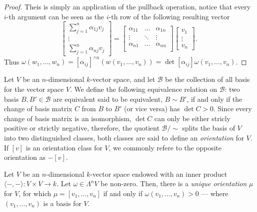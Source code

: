 \begin{proof}
Theis is simply an application of the pullback operation, notice that every
\(i\)-th argument can be seen as the \(i\)-th row of the following resulting
vector
\[
  \begin{bmatrix}
    \sum_{j=1}^n \alpha_{1 j} v_j \\ \vdots \\ \sum_{j=1}^n \alpha_{n j} v_j
  \end{bmatrix}
  =
  \begin{bmatrix}
    \alpha_{11} &\dots &\alpha_{1n} \\
    \vdots &\ddots &\vdots \\
    \alpha_{n1} &\dots &\alpha_{nn} \\
  \end{bmatrix}
  \begin{bmatrix}
    v_1 \\ \vdots \\ v_n
  \end{bmatrix}.
\]
Thus \(\omega(w_1, \dots, w_n) = [\alpha_{ij}]^{\wedge n}(w(v_{1}, \dots, v_n))
= \det [\alpha_{ij}] \omega(v_1, \dots, v_n)\).
\end{proof}

\begin{definition}[Orientation]
\label{def:orientation}
Let \(V\) be an \(n\)-dimensional \(k\)-vector space, and let \(\mathcal B\) be
the collection of all basis for the vector space \(V\). We define the following
equivalence relation on \(\mathcal B\): two basis \(B, B' \in \mathcal B\) are
equivalent said to be equivalent, \(B \sim B'\), if and only if the change of
basis matrix \(C\) from \(B\) to \(B'\) (or vice versa) has \(\det C >
0\). Since every change of basis matrix is an isomorphism, \(\det C\) can only
be either stricly positive or strictly negative, therefore, the quotient
\(\mathcal B/{\sim}\) splits the basis of \(V\) into two distinguished classes,
both classes are said to define an \emph{orientation} for \(V\). If \([v]\) is
an orientation class for \(V\), we commonly refere to the opposite orientation
as \(-[v]\).
\end{definition}

\begin{corollary}\label{cor:unique-orientation}
Let \(V\) be an \(n\)-dimensional \(k\)-vector space endowed with an inner
product \(\langle -, - \rangle: V \times V \to k\). Let \(\omega \in \Lambda^n
V\) be non-zero. Then, there is a \emph{unique orientation} \(\mu\) for \(V\),
for which \(\mu = [v_1, \dots, v_n]\) if and only if \(\omega(v_1, \dots, v_n) >
0\) --- where \((v_1, \dots, v_n)\) is a basis for \(V\).
\end{corollary}

